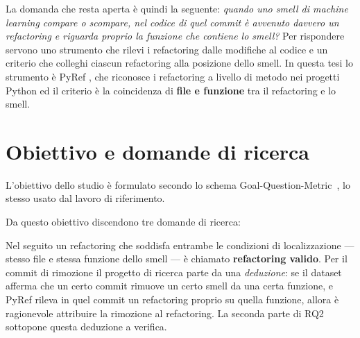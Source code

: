 La domanda che resta aperta è quindi la seguente: \textit{quando uno smell di machine learning compare o scompare, nel codice di quel commit è avvenuto davvero un refactoring e riguarda proprio la funzione che contiene lo smell?} Per rispondere servono uno strumento che rilevi i refactoring dalle modifiche al codice e un criterio che colleghi ciascun refactoring alla posizione dello smell. In questa tesi lo strumento è PyRef \cite{pyref}, che riconosce i refactoring a livello di metodo nei progetti Python ed il criterio è la coincidenza di \textbf{file e funzione} tra il refactoring e lo smell.

\section{Obiettivo e domande di ricerca}

L'obiettivo dello studio è formulato secondo lo schema Goal-Question-Metric~\cite{basili1994}, lo stesso usato dal lavoro di riferimento.


Da questo obiettivo discendono tre domande di ricerca:




Nel seguito un refactoring che soddisfa entrambe le condizioni di localizzazione — stesso file e stessa funzione dello smell — è chiamato \textbf{refactoring valido}. Per il commit di rimozione il progetto di ricerca parte da una \textit{deduzione}: se il dataset afferma che un certo commit rimuove un certo smell da una certa funzione, e PyRef rileva in quel commit un refactoring proprio su quella funzione, allora è ragionevole attribuire la rimozione al refactoring. La seconda parte di RQ2 sottopone questa deduzione a verifica.

